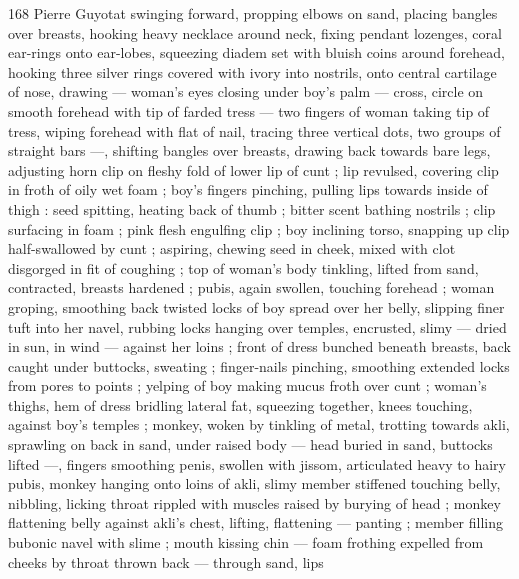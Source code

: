 168 Pierre Guyotat
swinging forward, propping elbows on sand, placing bangles over
breasts, hooking heavy necklace around neck, fixing pendant
lozenges, coral ear-rings onto ear-lobes, squeezing diadem set with
bluish coins around forehead, hooking three silver rings covered with
ivory into nostrils, onto central cartilage of nose, drawing —
woman's eyes closing under boy's palm — cross, circle on smooth
forehead with tip of farded tress — two fingers of woman taking tip
of tress, wiping forehead with flat of nail, tracing three vertical dots,
two groups of straight bars —, shifting bangles over breasts,
drawing back towards bare legs, adjusting horn clip on fleshy fold of
lower lip of cunt ; lip revulsed, covering clip in froth of oily wet foam
; boy's fingers pinching, pulling lips towards inside of thigh : seed
spitting, heating back of thumb ; bitter scent bathing nostrils ; clip
surfacing in foam ; pink flesh engulfing clip ; boy inclining torso,
snapping up clip half-swallowed by cunt ; aspiring, chewing seed in
cheek, mixed with clot disgorged in fit of coughing ; top of woman's
body tinkling, lifted from sand, contracted, breasts hardened ; pubis,
again swollen, touching forehead ; woman groping, smoothing back
twisted locks of boy spread over her belly, slipping finer tuft into her
navel, rubbing locks hanging over temples, encrusted, slimy — dried
in sun, in wind — against her loins ; front of dress bunched beneath
breasts, back caught under buttocks, sweating ; finger-nails pinching,
smoothing extended locks from pores to points ; yelping of boy
making mucus froth over cunt ; woman's thighs, hem of dress
bridling lateral fat, squeezing together, knees touching, against
boy's temples ; monkey, woken by tinkling of metal, trotting towards
akli, sprawling on back in sand, under raised body — head buried in
sand, buttocks lifted —, fingers smoothing penis, swollen with
jissom, articulated heavy to hairy pubis, monkey hanging onto loins
of akli, slimy member stiffened touching belly, nibbling, licking throat
rippled with muscles raised by burying of head ; monkey flattening
belly against akli’s chest, lifting, flattening — panting ; member
filling bubonic navel with slime ; mouth kissing chin — foam frothing
expelled from cheeks by throat thrown back — through sand, lips


